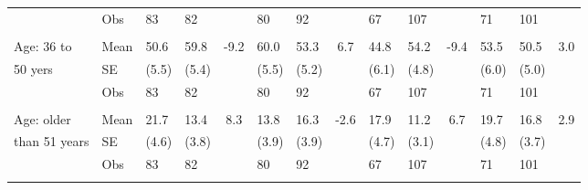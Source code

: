 \documentclass[
	article,			%
	12pt,				%
	oneside,			%
	a4paper,			%
	]{article}
\begin{document}
\begin{table}[h!]
\begin{tabular}{lp{2.335em}p{1.915em}p{2.085em}cp{1.915em}p{1.915em}cp{1.915em}p{1.915em}cp{1.915em}p{1.915em}c}
           &        Obs &         83 &         82 &            &         80 &         92 &            &         67 &        107 &            &         71 &        101 &            \\

           &            &            &            &            &            &            &            &            &            &            &            &            &            \\

Age: 36 to  &       Mean &       50.6 &       59.8 &       -9.2 &       60.0 &       53.3 &        6.7 &       44.8 &       54.2 &       -9.4 &       53.5 &       50.5 &        3.0 \\

   50 yers &         SE &      (5.5) &      (5.4) &            &      (5.5) &      (5.2) &            &      (6.1) &      (4.8) &            &      (6.0) &      (5.0) &            \\

           &        Obs &         83 &         82 &            &         80 &         92 &            &         67 &        107 &            &         71 &        101 &            \\

           &            &            &            &            &            &            &            &            &            &            &            &            &            \\

Age: older  &       Mean &       21.7 &       13.4 &        8.3 &       13.8 &       16.3 &       -2.6 &       17.9 &       11.2 &        6.7 &       19.7 &       16.8 &        2.9 \\

than 51 years &         SE &      (4.6) &      (3.8) &            &      (3.9) &      (3.9) &            &      (4.7) &      (3.1) &            &      (4.8) &      (3.7) &            \\

           &        Obs &         83 &         82 &            &         80 &         92 &            &         67 &        107 &            &         71 &        101 &            \\

           &            &            &            &            &            &            &            &            &            &            &            &            &            \\


\end{tabular}
\end{table}
\end{document}
